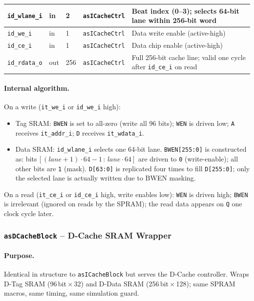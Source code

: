 \begin{table}[H]
\begin{tabularx}{\textwidth}{|l |l |l |l |X|}
  \hline
  \texttt{id\_wlane\_i}   & in  & 2   & \texttt{asICacheCtrl} & Beat index (0--3); selects 64-bit lane within 256-bit word \\
  \hline
  \texttt{id\_we\_i}      & in  & 1   & \texttt{asICacheCtrl} & Data write enable (active-high) \\
  \hline
  \texttt{id\_ce\_i}      & in  & 1   & \texttt{asICacheCtrl} & Data chip enable (active-high) \\
  \hline
  \texttt{id\_rdata\_o}   & out & 256 & \texttt{asICacheCtrl} & Full 256-bit cache line; valid one cycle after \texttt{id\_ce\_i} on read \\
  \hline
\end{tabularx}
\end{table}

\paragraph{Internal algorithm.}
On a write (\texttt{it\_we\_i} or \texttt{id\_we\_i} high):
\begin{itemize}
  \item Tag SRAM: \texttt{BWEN} is set to all-zero (write all 96 bits);
    \texttt{WEN} is driven low; \texttt{A} receives \texttt{it\_addr\_i};
    \texttt{D} receives \texttt{it\_wdata\_i}.
  \item Data SRAM: \texttt{id\_wlane\_i} selects one 64-bit lane.
    \texttt{BWEN[255:0]} is constructed as: bits\,$[(lane+1)\cdot64-1\,:\,lane\cdot64]$
    are driven to \texttt{0} (write-enable); all other bits are \texttt{1}
    (mask).
    \texttt{D[63:0]} is replicated four times to fill \texttt{D[255:0]};
    only the selected lane is actually written due to BWEN masking.
\end{itemize}
On a read (\texttt{it\_ce\_i} or \texttt{id\_ce\_i} high, write enables
low): \texttt{WEN} is driven high; \texttt{BWEN} is irrelevant (ignored
on reads by the SPRAM); the read data appears on \texttt{Q} one clock
cycle later.

\subsubsection{\texttt{asDCacheBlock} -- D-Cache SRAM Wrapper}
\label{subsubsec:asDCacheBlock}

\paragraph{Purpose.}
Identical in structure to \texttt{asICacheBlock} but serves the D-Cache
controller.
Wraps D-Tag SRAM (96\,bit\,$\times$\,32) and D-Data SRAM
(256\,bit\,$\times$\,128); same SPRAM macros, same timing, same
simulation guard.

